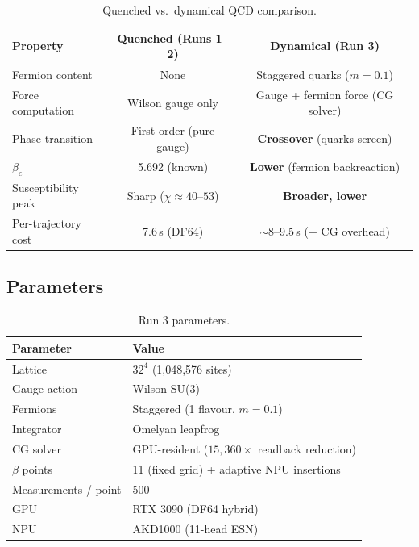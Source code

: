 \documentclass[11pt,a4paper]{article}
\newcommand{\btc}{\beta_c}
\begin{document}
\begin{table}[H]
\centering
\caption{Quenched vs.\ dynamical QCD comparison.}
\label{tab:dyn}
\renewcommand{\arraystretch}{1.25}
\begin{tabular}{lcc}
\toprule
Property & Quenched (Runs 1--2) & Dynamical (Run 3) \\
\midrule
Fermion content   & None               & Staggered quarks ($m = 0.1$) \\
Force computation & Wilson gauge only  & Gauge + fermion force (CG solver) \\
Phase transition  & First-order (pure gauge) & \textbf{Crossover} (quarks screen) \\
$\btc$            & 5.692 (known)      & \textbf{Lower} (fermion backreaction) \\
Susceptibility peak & Sharp ($\chi \approx 40$--$53$) & \textbf{Broader, lower} \\
Per-trajectory cost & 7.6\,s (DF64)   & $\sim$8--9.5\,s ($+$ CG overhead) \\
\bottomrule
\end{tabular}
\end{table}

\subsection{Parameters}

\begin{table}[H]
\centering
\caption{Run 3 parameters.}
\label{tab:run3params}
\renewcommand{\arraystretch}{1.25}
\begin{tabular}{ll}
\toprule
Parameter & Value \\
\midrule
Lattice          & $32^4$ (1,048,576 sites) \\
Gauge action     & Wilson SU(3) \\
Fermions         & Staggered (1 flavour, $m = 0.1$) \\
Integrator       & Omelyan leapfrog \\
CG solver        & GPU-resident ($15{,}360\times$ readback reduction) \\
$\beta$ points   & 11 (fixed grid) + adaptive NPU insertions \\
Measurements / point & 500 \\
GPU              & RTX 3090 (DF64 hybrid) \\
NPU              & AKD1000 (11-head ESN) \\
\bottomrule
\end{tabular}
\end{table}
\end{document}
